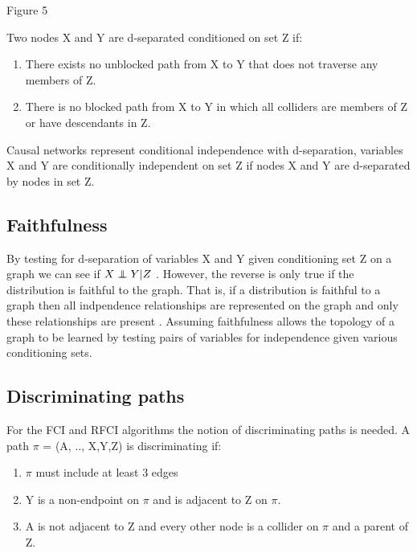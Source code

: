 \documentclass{article}
\newcommand\independent{\protect\mathpalette{\protect\independenT}{\perp}}
\def\independenT#1#2{\mathrel{\rlap{$#1#2$}\mkern2mu{#1#2}}}
\begin{document}
\begin{center}
Figure 5
\end{center}


Two nodes X and Y are d-separated conditioned on set Z if:
\begin{enumerate}
	\item There exists no unblocked path from X to Y that does not traverse any members of Z.\cite{pearl2003causality}
	\item There is no blocked path from X to Y in which all colliders are members of Z or have descendants in Z.\cite{pearl2003causality}
\end{enumerate} 

Causal networks represent conditional independence with d-separation, variables X and Y are conditionally independent on set Z if nodes X and Y are d-separated by nodes in set Z\cite{verma1990causal}.
\\

\subsection{Faithfulness}


By testing for d-separation of variables X and Y given conditioning set Z on a graph we can see if $X \independent Y | Z$ \cite{pearl2009}. However, the reverse is only true if the distribution is faithful to the graph. That is, if a distribution is faithful to a graph then all indpendence relationships are represented on the graph and only these relationships are present \cite{scheines1997introduction}. Assuming faithfulness allows the topology of a graph to be learned by testing pairs of variables for independence given various conditioning sets.
\\

\subsection{Discriminating paths}
For the FCI and RFCI algorithms the notion of discriminating paths is needed. A path $\pi$ = (A, .., X,Y,Z) is discriminating if:
\\

\begin{enumerate}
\item $\pi$ must include at least 3 edges
\item Y is a non-endpoint on $\pi$ and is adjacent to Z on $\pi$.
\item A is not adjacent to Z and every other node is a collider on $\pi$ and a parent of Z. \cite{colombo2012learning} 
\end{enumerate}
\end{document}
